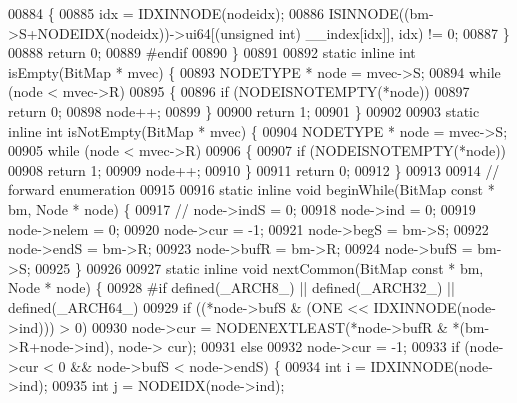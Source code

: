 \begin{DoxyCode}
00884         \{
00885                 idx = IDXINNODE(nodeidx);
00886                 ISINNODE((bm->S+NODEIDX(nodeidx))->ui64[(\textcolor{keywordtype}{unsigned} \textcolor{keywordtype}{int}) \_\_index[idx]], idx) != 0;
00887         \}
00888         \textcolor{keywordflow}{return} 0;
00889 \textcolor{preprocessor}{#endif}
00890 \}
00891 
00892 \textcolor{keyword}{static} \textcolor{keyword}{inline} \textcolor{keywordtype}{int} isEmpty(BitMap * mvec) \{
00893         NODETYPE * node = mvec->S;
00894         \textcolor{keywordflow}{while} (node < mvec->R)
00895         \{
00896                 \textcolor{keywordflow}{if} (NODEISNOTEMPTY(*node))
00897                         \textcolor{keywordflow}{return} 0;
00898                 node++;
00899         \}
00900         \textcolor{keywordflow}{return} 1;
00901 \}
00902 
00903 \textcolor{keyword}{static} \textcolor{keyword}{inline} \textcolor{keywordtype}{int} isNotEmpty(BitMap * mvec) \{
00904         NODETYPE * node = mvec->S;
00905         \textcolor{keywordflow}{while} (node < mvec->R)
00906         \{
00907                 \textcolor{keywordflow}{if} (NODEISNOTEMPTY(*node))
00908                         \textcolor{keywordflow}{return} 1;
00909                 node++;
00910         \}
00911         \textcolor{keywordflow}{return} 0;
00912 \}
00913 
00914 \textcolor{comment}{// forward enumeration}
00915 
00916 \textcolor{keyword}{static} \textcolor{keyword}{inline} \textcolor{keywordtype}{void} beginWhile(BitMap \textcolor{keyword}{const} * bm, Node * node) \{
00917 \textcolor{comment}{//      node->indS = 0;}
00918         node->ind = 0;
00919         node->nelem = 0;
00920         node->cur = -1;
00921         node->begS = bm->S;
00922         node->endS = bm->R;
00923         node->bufR = bm->R;
00924         node->bufS = bm->S;
00925 \}
00926 
00927 \textcolor{keyword}{static} \textcolor{keyword}{inline} \textcolor{keywordtype}{void} nextCommon(BitMap \textcolor{keyword}{const} * bm, Node * node) \{
00928 \textcolor{preprocessor}{#if defined(\_ARCH8\_) || defined(\_ARCH32\_) || defined(\_ARCH64\_)}
00929         \textcolor{keywordflow}{if} ((*node->bufS & (ONE << IDXINNODE(node->ind))) > 0)
00930                 node->cur = NODENEXTLEAST(*node->bufR & *(bm->R+node->ind), node->
      cur);
00931         \textcolor{keywordflow}{else}
00932                 node->cur = -1;
00933         \textcolor{keywordflow}{if} (node->cur < 0 && node->bufS < node->endS) \{
00934                 \textcolor{keywordtype}{int} i = IDXINNODE(node->ind);
00935                 \textcolor{keywordtype}{int} j = NODEIDX(node->ind);

\end{DoxyCode}
